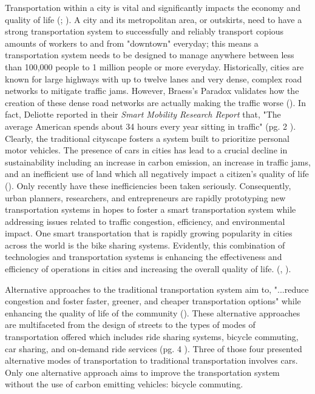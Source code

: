 \documentclass[12pt]{article}
\begin{document}
 Transportation within a city is vital and significantly impacts the economy and quality of life (\cite{dávalos_maldonado_polit_2016}; \cite{zuluaga_garcía_2017}). A city and its metropolitan area, or outskirts, need to have a strong transportation system to successfully and reliably transport copious amounts of workers to and from "downtown" everyday; this means a transportation system needs to be designed to manage anywhere between less than 100,000 people to 1 million people or more everyday. Historically, cities are known for large highways with up to twelve lanes and very dense, complex road networks to mitigate traffic jams. However, Braess's Paradox validates how the creation of these dense road networks are actually making the traffic worse (\cite{wikipedia_2020}). In fact, Deliotte reported in their \textit{Smart Mobility Research Report} that, "The average American spends about 34 hours every year sitting in traffic" (pg. 2 \cite{DeliotteReport}). Clearly, the traditional cityscape fosters a system built to prioritize personal motor vehicles. The presence of cars in cities has lead to a crucial decline in sustainability including an increase in carbon emission, an increase in traffic jams, and an inefficient use of land which all negatively impact a citizen's quality of life (\cite{dávalos_maldonado_polit_2016}). Only recently have these inefficiencies been taken seriously. Consequently, urban planners, researchers, and entrepreneurs are rapidly prototyping new transportation systems in hopes to foster a smart transportation system while addressing issues related to traffic congestion, efficiency, and environmental impact. One smart transportation that is rapidly growing popularity in cities across the world is the bike sharing systems. Evidently, this combination of technologies and transportation systems is enhancing the effectiveness and efficiency of operations in cities and increasing the overall quality of life.  (\cite{montoya2017acceso}, \cite{dávalos_maldonado_polit_2016}).

Alternative approaches to the traditional transportation system aim to, "...reduce congestion and foster faster, greener, and cheaper transportation options" while enhancing the quality of life of the community (\cite{DeliotteReport}). These alternative approaches are multifaceted from the design of streets to the types of modes of transportation offered which includes ride sharing systems, bicycle commuting, car sharing, and on-demand ride services (pg. 4 \cite{DeliotteReport}). Three of those four presented alternative modes of transportation to traditional transportation involves cars. Only one alternative approach aims to improve the transportation system without the use of carbon emitting vehicles: bicycle commuting. 
\end{document}
